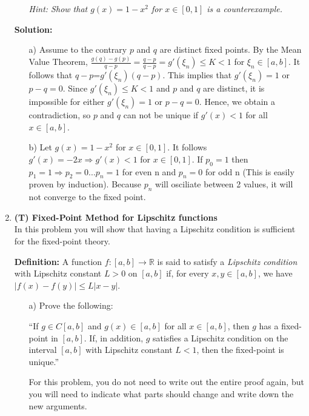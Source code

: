 \documentclass[10pt]{article}
\begin{document}
\begin{enumerate}[label=\bfseries Problem \arabic*:]
\begin{itemize}
\textit{Hint: Show that $g(x)=1-x^2$ for $x\in[0,1]$ is a counterexample.}
\end{itemize}
\vspace{1em}
\textbf{Solution:}\par
\begin{itemize}
    \item [a)] Assume to the contrary $p$ and $q$ are distinct fixed points. 
    By the Mean Value Theorem, $\frac{g(q)-g(p)}{q-p}=\frac{q-p}{q-p}=g'(\xi_n)\le K<1$ for $\xi_n\in[a,b]$. 
    It follows that $q-p$=$g'(\xi_n)(q-p)$. This implies that $g'(\xi_n)=1$ or $p-q=0$. 
    Since $g'(\xi_n)\le K<1$ and $p$ and $q$ are distinct, it is impossible for either $g'(\xi_n)=1$ or $p-q=0$.
    Hence, we obtain a contradiction, so $p$ and $q$ can not be unique if $g'(x)<1$ for all $x\in[a,b]$.
    \item [b)] Let $g(x)=1-x^2$ for $x\in[0,1]$. 
    It follows $g'(x)=-2x\Rightarrow g'(x)<1$ for $x\in [0,1]$.
    If $p_0=1$ then $p_1=1\Rightarrow p_2=0...$$p_n=1$ for even n and $p_n=0$ for odd n (This is easily proven by induction).
    Because $p_n$ will osciliate between 2 values, it will not converge to the fixed point.
    
\end{itemize}
\newpage

\item \textbf{(T) Fixed-Point Method for Lipschitz functions}\\
In this problem you will show that having a Lipschitz condition is sufficient for the fixed-point theory. 

\textbf{Definition:} A function $f:[a,b] \rightarrow \mathbb{R}$ is said to satisfy a \textit{Lipschitz condition} with Lipschitz constant $L>0$ on $[a,b]$ if, for every $x,y \in [a,b]$, we have $|f(x)-f(y)| \leq L |x-y|$. 


\begin{itemize} 
\item[a)] Prove the following:\par
``If $g \in C[a,b]$ and $g(x) \in [a,b]$ for all $x\in[a,b]$, then $g$ has a fixed-point in $[a,b]$. If, in addition, $g$ satisfies a Lipschitz condition on the interval $[a,b]$ with Lipschitz constant $L<1$, then the fixed-point is unique.''\par

For this problem, you do not need to write out the entire proof again, but you will need to indicate what parts should change and write down the new arguments.


\end{itemize}
\end{enumerate}
\end{document}
